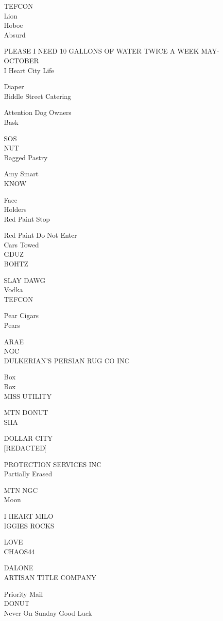 \documentclass[10pt,letterpaper]{article}
\begin{document}
TEFCON\\
Lion\\
Hoboe\\
Absurd

PLEASE I NEED 10 GALLONS OF WATER TWICE A WEEK MAY{-}OCTOBER\\
I Heart City Life

Diaper\\
Biddle Street Catering

Attention Dog Owners\\
Bask

SOS\\
NUT\\
Bagged Pastry

Amy Smart\\
KNOW

Face\\
Holders\\
Red Paint Stop

Red Paint Do Not Enter\\
Cars Towed\\
GDUZ\\
BOHTZ

SLAY DAWG\\
Vodka\\
TEFCON

Pear Cigars\\
Pears

ARAE\\
NGC\\
DULKERIAN'S PERSIAN RUG CO INC

Box\\
Box\\
MISS UTILITY

MTN DONUT\\
SHA

DOLLAR CITY\\
{[}REDACTED{]}

PROTECTION SERVICES INC\\
Partially Erased

MTN NGC\\
Moon

I HEART MILO\\
IGGIES ROCKS

LOVE\\
CHAOS44

DALONE\\
ARTISAN TITLE COMPANY

Priority Mail\\
DONUT\\
Never On Sunday Good Luck
\end{document}
